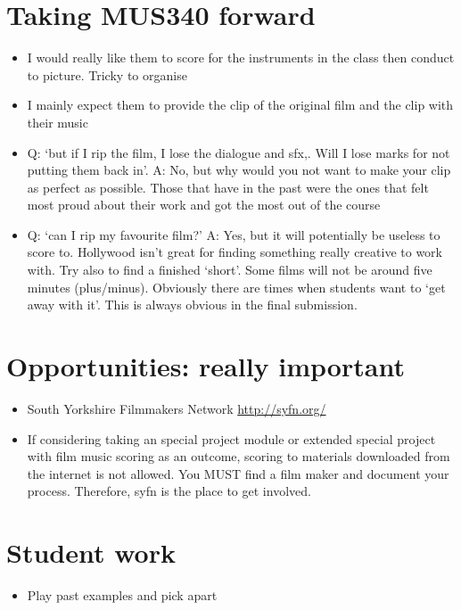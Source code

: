 \section{Taking MUS340 forward}
\begin{itemize}
\item I would really like them to score for the instruments in the class then conduct to picture. Tricky to organise
\item I mainly expect them to provide the clip of the original film and the clip with their music
\item Q: `but if I rip the film, I lose the dialogue and sfx,. Will I lose marks for not putting them back in'. A: No, but why would you not want to make your clip as perfect as possible. Those that have in the past were the ones that felt most proud about their work and got the most out of the course
\item Q: `can I rip my favourite film?' A: Yes, but it will potentially be useless to score to. Hollywood isn't great for finding something really creative to work with. Try also to find a finished `short'. Some films will not be around five minutes (plus/minus). Obviously there are times when students want to `get away with it'. This is always obvious in the final submission. 
\end{itemize}

\section{Opportunities: really important}
\begin{itemize}
\item South Yorkshire Filmmakers Network \url{http://syfn.org/}
\item If considering taking an special project module or extended special project with film music scoring as an outcome, scoring to materials downloaded from the internet is not allowed. You MUST find a film maker and document your process. Therefore, syfn is the place to get involved. 
\end{itemize}

\section{Student work}
\begin{itemize}
\item Play past examples and pick apart
\end{itemize}



